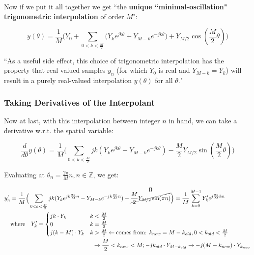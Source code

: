 \documentclass[10pt]{article}
\begin{document}
Now if we put it all together we get ``the \textbf{unique ``minimal-oscillation" trigonometric interpolation} of order $M$":

\begin{equation}\label{interpolant}
y(\theta) = \frac{1}{M} \Big(Y_0 + \sum_{0 < k < \frac{M}{2}} \big(Y_k e^{j k \theta} + Y_{M-k} e^{-j k \theta}\big) + Y_{M/2}\cos(\frac{M}{2}\theta) \Big)
\end{equation}

``As a useful side effect, this choice of trigonometric interpolation has the property that real-valued samples $y_n$ (for which $Y_0$ is real and $Y_{M-k} = \overline{Y_k}$) will result in a purely real-valued interpolation $y(\theta)$ for all $\theta$."

\subsubsection{Taking Derivatives of the Interpolant}

Now at last, with this interpolation between integer $n$ in hand, we can take a derivative w.r.t. the spatial variable:

$$\frac{d}{d\theta} y(\theta) = \frac{1}{M} \Big( \sum_{0 < k < \frac{M}{2}} j k (Y_k e^{j k \theta} - Y_{M-k} e^{-j k \theta}) - \frac{M}{2} Y_{M/2} \sin(\frac{M}{2}\theta) \Big)$$

Evaluating at $\theta_n = \frac{2\pi}{M}n, n \in \mathbb{Z}$, we get:\vspace{-5mm}

\begin{align*}
y'_n &= \frac{1}{M} \Big( \sum_{0 < k < \frac{M}{2}} j k (Y_k e^{j k \frac{2\pi}{M}n} - Y_{M-k} e^{-j k \frac{2\pi}{M}n}) - \overset{\text{\large 0}}{\cancel{\frac{M}{2} Y_{M/2} \sin(\pi n)}} \Big) = \frac{1}{M} \sum_{k = 0}^{M-1} Y'_k e^{j\frac{2\pi}{M}kn} \\
& \text{where} \quad Y'_k = \begin{cases} j k \cdot Y_k & k < \frac{M}{2} \\ 0 & k = \frac{M}{2} \\ j(k - M) \cdot Y_k & k > \frac{M}{2} \leftarrow \text{comes from: } k_{new} = M - k_{old}, 0 < k_{old} < \frac{M}{2} \end{cases}\\ & \hspace{5cm} \rightarrow \frac{M}{2} < k_{new} < M; -jk_{old} \cdot Y_{M - k_{old}} \rightarrow -j(M - k_{new}) \cdot Y_{k_{new}}
\end{align*}
\end{document}
